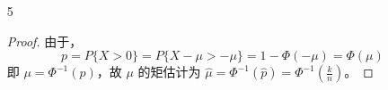 \documentclass[normal,cn]{elegantnote}
\begin{document}
\begin{enumerate}
\begin{proof}
\begin{equation*}
\begin{aligned}
                    =                      & \mu^{2}+2\theta E(X)                                                                                                  \\
                    =                      & \mu^{2}+2\mu\theta+2\theta^{2}
                \end{aligned}
            \end{equation*}
            因此，
            \begin{equation*}
                E(X)=\mu+\theta,\quad\operatorname{Var}(X)=E\left(X^{2}\right)-[E(X)]^{2}=\theta^{2}
            \end{equation*}
            即
            \begin{equation*}
                \theta=\sqrt{\operatorname{Var}(X)},\quad\mu=E(X)-\sqrt{\operatorname{Var}(X)}
            \end{equation*}
            故 $(\theta,\mu)$ 的矩估计为
            \begin{equation*}
                \hat{\theta}=\sqrt{S^2},\quad\hat{\mu}=\bar{X}-\sqrt{S^2}
            \end{equation*}
        \end{proof}
    \item[5]
        \begin{proof}
            由于，
            \begin{equation*}
                p=P\{X>0\}=P\{X-\mu>-\mu\}=1-\Phi(-\mu)=\Phi(\mu)
            \end{equation*}
            即 $\mu=\Phi^{-1}(p)$，故 $\mu$ 的矩估计为 $\hat{\mu}=\Phi^{-1}(\hat{p})=\Phi^{-1}\left(\frac{k}{n}\right)$。
        \end{proof}
\end{enumerate}
\end{document}
